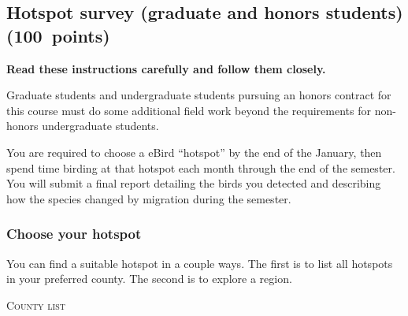 \documentclass[12pt]{article}
\begin{document}
\thispagestyle{plain}

\subsection*{Hotspot survey (graduate and honors students) (100\ points)}

\textbf{Read these instructions carefully and follow them closely.}

Graduate students and undergraduate students pursuing an honors contract for this course must do some additional field work beyond the requirements for non-honors undergraduate students.

You are required to choose a eBird “hotspot” by the end of the January, then spend time birding at that hotspot each month through the end of the semester. You will submit a final report detailing the birds you detected and describing how the species changed by migration during the semester.

\subsubsection*{Choose your hotspot}

You can find a suitable hotspot in a couple ways. The first is to list all hotspots in your preferred county. The second is to explore a region.

\textsc{County list}
\end{document}
